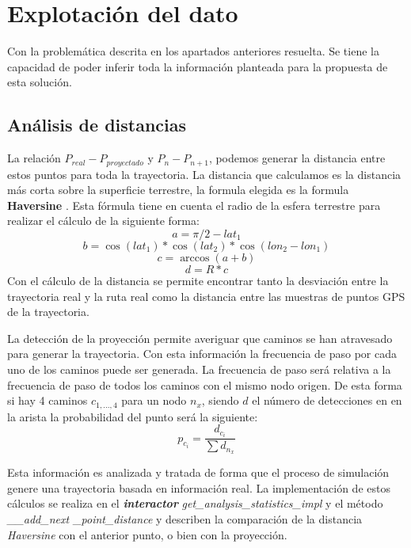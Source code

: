 \section{Explotación del dato}
\label{section:ExplotacionDato}
Con la problemática descrita en los apartados anteriores resuelta. Se tiene la capacidad de poder 
inferir toda la información planteada para la propuesta de esta solución.

\subsection{Análisis de distancias}
\label{section: AnalisisDistancias}
La relación $P_{real} - P_{proyectado}$ y $P_{n} - P_{n+1}$, podemos generar la distancia entre estos puntos 
para toda la trayectoria. La distancia que calculamos es la distancia más corta sobre la superficie terrestre, 
la formula elegida es la formula \textbf{Haversine} \cite{Gis01} \cite{Haver01}. Esta fórmula tiene en cuenta 
el radio de la esfera terrestre para realizar el cálculo de la siguiente forma:
\begin{equation}
a = \pi/2 - lat_{1}
\end{equation}
\begin{equation}
b = \cos(lat_{1}) * \cos(lat_{2}) * \cos(lon_{2} - lon_{1})
\end{equation}
\begin{equation}
c = \arccos(a + b)
\end{equation}
\begin{equation}
d = R * c
\end{equation}
Con el cálculo de la distancia se permite encontrar tanto la desviación entre la trayectoria real y la 
ruta real como la distancia entre las muestras de puntos \ac{GPS} de la trayectoria.

La detección de la proyección permite averiguar que caminos se han atravesado para generar la 
trayectoria. Con esta información la frecuencia de paso por cada uno de los
caminos puede ser generada. La frecuencia de paso será relativa a la frecuencia de paso de todos 
los caminos con el mismo nodo origen. De esta forma si hay 4 caminos $c_{1,...,4}$ para un nodo 
$n_{x}$, siendo $d$ el número de detecciones en en la arista la probabilidad del punto será la 
siguiente:
\begin{equation}
p_{c_{i}} = \frac{d_{c_{i}}}{\sum{d_{n_{x}}}}
\end{equation}


Esta información es analizada y tratada de forma que el proceso de simulación genere una 
trayectoria basada en información real. La implementación de estos cálculos se realiza en el 
\textbf{\textit{interactor}} \textit{get\_analysis\_statistics\_impl} y el método \textit{\_\_add\_next
\_point\_distance} y describen la comparación de la distancia \textit{Haversine} con el anterior 
punto, o bien con la proyección.

